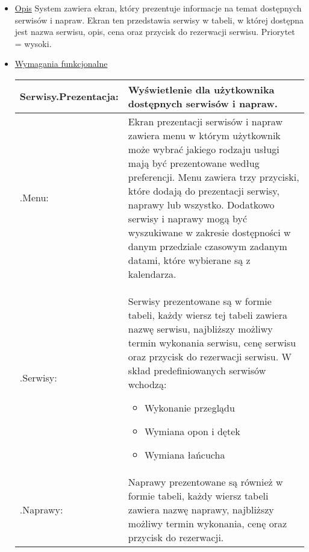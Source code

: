 \documentclass[a4paper,20pt]{article}
\begin{document}
\begin{itemize}
\item \underline{Opis} 
\newline
\newline
System zawiera ekran, który prezentuje informacje na temat dostępnych serwisów i napraw. Ekran ten przedstawia serwisy w tabeli, w której dostępna jest nazwa serwisu, opis, cena oraz przycisk do rezerwacji serwisu. Priorytet = wysoki. 
\newline

\item \underline{Wymagania funkcjonalne}

\begin{center}
\begin{tabularx}{\textwidth}[t]{XX}


\arrayrulecolor{black}\hline
\textbf{Serwisy.Prezentacja:} & \textbf{Wyświetlenie dla użytkownika dostępnych serwisów i napraw.} \\

\hline

\quad .Menu: & 
\begin{minipage}[t]{\linewidth}%
Ekran prezentacji serwisów i napraw zawiera menu w którym użytkownik może wybrać jakiego rodzaju usługi mają być prezentowane według preferencji. Menu zawiera trzy przyciski, które dodają do prezentacji serwisy, naprawy lub wszystko. Dodatkowo serwisy i naprawy mogą być wyszukiwane w zakresie dostępności w danym przedziale czasowym zadanym datami, które wybierane są z kalendarza.
\end{minipage} \\


\quad .Serwisy: & 
\begin{minipage}[t]{\linewidth}%
Serwisy prezentowane są w formie tabeli, każdy wiersz tej tabeli zawiera nazwę serwisu, najbliższy możliwy termin wykonania serwisu, cenę serwisu oraz przycisk do rezerwacji serwisu. W skład predefiniowanych serwisów wchodzą:
\begin{itemize}
\item Wykonanie przeglądu 
\item Wymiana opon i dętek
\item Wymiana łańcucha
\end{itemize}
\end{minipage} \\

\quad .Naprawy: & 
\begin{minipage}[t]{\linewidth}%
Naprawy prezentowane są również w formie tabeli, każdy wiersz tabeli zawiera nazwę naprawy, najbliższy możliwy termin wykonania, cenę oraz przycisk do rezerwacji.      
\end{minipage}\\


\end{tabularx}
\end{center}
\end{itemize}
\end{document}
